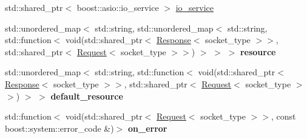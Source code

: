\begin{DoxyCompactItemize}
\item 
std\+::shared\+\_\+ptr$<$ boost\+::asio\+::io\+\_\+service $>$ \hyperlink{classhttp_1_1_server_base_a89757fd47a78aa8686df56b4ca78bdd1}{io\+\_\+service}
\item 
\mbox{\label{classhttp_1_1_server_base_acc93479e120746948d50964397d8d859}} 
std\+::unordered\+\_\+map$<$ std\+::string, std\+::unordered\+\_\+map$<$ std\+::string, std\+::function$<$ void(std\+::shared\+\_\+ptr$<$ \hyperlink{classhttp_1_1_server_base_1_1_response}{Response}$<$ socket\+\_\+type $>$$>$, std\+::shared\+\_\+ptr$<$ \hyperlink{classhttp_1_1_server_base_1_1_request}{Request}$<$ socket\+\_\+type $>$$>$) $>$ $>$ $>$ {\bfseries resource}
\item 
\mbox{\label{classhttp_1_1_server_base_af48f0ef80212ddfbc94860cc6fc26e95}} 
std\+::unordered\+\_\+map$<$ std\+::string, std\+::function$<$ void(std\+::shared\+\_\+ptr$<$ \hyperlink{classhttp_1_1_server_base_1_1_response}{Response}$<$ socket\+\_\+type $>$$>$, std\+::shared\+\_\+ptr$<$ \hyperlink{classhttp_1_1_server_base_1_1_request}{Request}$<$ socket\+\_\+type $>$$>$) $>$ $>$ {\bfseries default\+\_\+resource}
\item 
\mbox{\label{classhttp_1_1_server_base_ab07e3aa1546694c35e53b4ab94c184b8}} 
std\+::function$<$ void(std\+::shared\+\_\+ptr$<$ \hyperlink{classhttp_1_1_server_base_1_1_request}{Request}$<$ socket\+\_\+type $>$$>$, const boost\+::system\+::error\+\_\+code \&)$>$ {\bfseries on\+\_\+error}
\end{DoxyCompactItemize}
